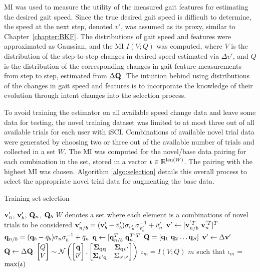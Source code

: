 MI was used to measure the utility of the measured gait features for estimating the desired gait speed. Since the true desired gait speed is difficult to determine, the speed at the next step, denoted $ v' $, was assumed as its proxy, similar to Chapter~\ref{chapter:BKF}. The distributions of gait speed and features were approximated as Gaussian, and the MI $ I(V ; Q) $ was computed, where $ V $ is the distribution of the step-to-step changes in desired speed estimated via $ \Delta v' $, and $ Q $ is the distribution of the corresponding changes in gait feature measurements from step to step, estimated from $ \Delta \mathbf{Q} $. The intuition behind using distributions of the changes in gait speed and features is to incorporate the knowledge of their evolution through intent changes into the selection process. 

To avoid training the estimator on all available speed change data and leave some data for testing, the novel training dataset was limited to at most three out of all available trials for each user with iSCI. Combinations of available novel trial data were generated by choosing two or three out of the available number of trials and collected in a set $ W $. The MI was computed for the novel/base data pairing for each combination in the set, stored in a vector $ \boldsymbol{\iota} \in \mathbb{R}^{{\rm len}(W)}$. The pairing with the highest MI was chosen. Algorithm \ref{algo:selection} details this overall process to select the appropriate novel trial data for augmenting the base data.

\begin{algorithm}
	\caption{Training set selection}\label{algo:selection}
	\begin{algorithmic}[1]
		\Require $ \mathbf{v}'_n$, $\mathbf{v}'_b $, $ \mathbf{Q}_n $, $\mathbf{Q}_b$
		 $ W $ denotes a set where each element is a combinations of novel trials to be considered
		\State $ \mathbf{v}'_{n/b} = (\mathbf{v}'_b - \bar{v}'_b)\sigma_{v'_n} \sigma_{v'_b}^{-1} + \bar{v}'_n $ 
		\State $ \v' \leftarrow [\v_{n/b}^{'T}\ \v_{n}^{'T}]^T $
		\State $ \mathbf{q}_{n/b} = (\mathbf{q}_b - \bar{q}_b)\sigma_n \sigma_b^{-1} + \bar{q}_n $ 
		\State $ \mathbf{q} \leftarrow [\mathbf{q}_{n/b}^T\ \mathbf{q}_{n}^T]^T $
		\EndFor
		\State $ \mathbf{Q} = [\mathbf{q}_1 \ \mathbf{q}_2 \dots \mathbf{q}_S] $
		\State $ \mathbf{v}' \leftarrow \Delta \mathbf{v}' $
		\State $ \mathbf{Q} \leftarrow \Delta \mathbf{Q} $
		\vskip 5pt
		\State $ \begin{bmatrix}
			Q \\
			V
		\end{bmatrix} \sim \mathcal{N} \left( \begin{bmatrix}
			\bar{\mathbf{q}} \\
			\bar{v}'
		\end{bmatrix},\begin{bmatrix}
			\boldsymbol{\Sigma}_{\mathbf{q} \mathbf{q}} & \boldsymbol{\Sigma}_{\mathbf{q} v'} \\
			\boldsymbol{\Sigma}_{v' \mathbf{q}} & \Sigma_{v'v'}
		\end{bmatrix}\right) $
		\vskip 2pt
		\State $ \iota_m = I(V;Q) $
		\EndFor
		\State \Return $m$ such that $\iota_m$ = $ \max(\boldsymbol{\iota}) $ 
	\end{algorithmic}
\end{algorithm}%

